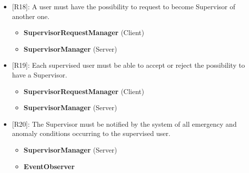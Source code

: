 \begin{itemize}[itemsep=0em]
	\item {[R18]: A user must have the possibility to request to become Supervisor of another one.}
	\begin{itemize}
		\item {\textbf{SupervisorRequestManager} (Client)}
		\item {\textbf{SupervisorManager} (Server)}
	\end{itemize}   
	\item {[R19]: Each supervised user must be able to accept or reject the possibility to have a Supervisor.}
	\begin{itemize}
		\item {\textbf{SupervisorRequestManager} (Client)}
		\item {\textbf{SupervisorManager} (Server)}
	\end{itemize}   
	\item {[R20]: The Supervisor must be notified by the system of all emergency and anomaly conditions occurring to the supervised user.}
	\begin{itemize}
		\item {\textbf{SupervisorManager} (Server)}
		\item {\textbf{EventObserver}}
	\end{itemize}   
	
\end{itemize}


